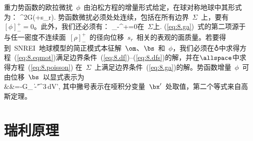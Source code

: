 重力势函数的欧拉微扰~$\phi$~由泊松方程的增量形式给定，在球对称地球中其形式为：
%
\eq
\del^2\pi G(\rho\bdel\cdot\bs+\drho s_r).
\label{eq:8.poisson}
\en
势函数微扰必须处处连续，包括在所有边界~$\Sigma$~上，要有$[\phi]^+_-=0$。此外，我们还必须有：
%
_-^+=0\quad\mbox{在 $\Sigma$上}.
\label{eq:8.ga}
\en
(\ref{eq:8.ga})~式的第二项源于与任一密度不连续面~$[\rho]^+_-$~的径向位移~$s_r$~相关的表观的面质量。若要得到~SNREI~地球模型的简正模式本征解~$\om$、$\bs$~和~$\phi$，我们必须在$\earth$中求得方程~(\ref{eq:8.eqmot})满足边界条件~(\ref{eq:8.df})--(\ref{eq:8.dfs})的解，并在$\allspace$中求得方程~(\ref{eq:8.poisson})
在~$\Sigma$~上满足边界条件~(\ref{eq:8.ga})的解。势函数增量~$\phi$~可由位移~$\bs$~以显式表示为
\eqa
\label{8.phiexpl}
 \nonumber \\
&&\mbox{}=-G\int_{\subearth}
{\|\bx-\bx'\|^3}\,dV',
\ena
其中撇号表示在哑积分变量~$\bx'$~处取值，第二个等式来自高斯定理。
%

\section{瑞利原理}
%
%


